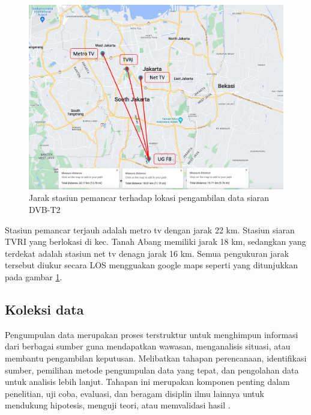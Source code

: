 \begin{figure}[H]
	\vspace{-0.1cm}
	\begin{center}
		\includegraphics[width=1\columnwidth]{bab4/Gambar/jarak-pemancar.png}
	\end{center}
	\vspace{-0.2cm}
	\caption{Jarak stasiun pemancar terhadap lokasi pengambilan data siaran DVB-T2}
	\label{jarak-pemancar}
\end{figure}

Stasiun pemancar terjauh adalah metro tv dengan jarak 22 km. Stasiun siaran TVRI yang berlokasi di kec. Tanah Abang memiliki jarak 18 km, sedangkan yang terdekat adalah stasiun net tv denagn jarak 16 km. Semua pengukuran jarak tersebut diukur secara LOS mengguakan google maps seperti yang ditunjukkan pada gambar \ref{jarak-pemancar}.






\subsection{Koleksi data}
\hspace{1,2cm}
Pengumpulan data merupakan proses terstruktur untuk menghimpun informasi dari berbagai sumber guna mendapatkan wawasan, menganalisis situasi, atau membantu pengambilan keputusan. Melibatkan tahapan perencanaan, identifikasi sumber, pemilihan metode pengumpulan data yang tepat, dan pengolahan data untuk analisis lebih lanjut. Tahapan ini merupakan komponen penting dalam penelitian, uji coba, evaluasi, dan beragam disiplin ilmu lainnya untuk mendukung hipotesis, menguji teori, atau memvalidasi hasil \citep{Yin}.

